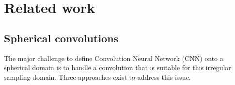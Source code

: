 \documentclass[final,twocolumn,3p,times,authoryear]{elsarticle}
\newcommand{\todo}[1]{{\color[rgb]{.6,.1,.6}{#1}}}
\newcommand{\assign}[1]{{\color[rgb]{.8,.5,.8}{Assigned: #1 }}}
\newcommand{\1}{\b{1}}              %
\newcommand{\0}{\b{0}}              %
\begin{document}







\section{Related work}
\label{sec:related}



\subsection{Spherical convolutions}
The major challenge to define Convolution Neural Network (CNN) onto a
spherical domain is to handle a convolution that is suitable for this irregular sampling domain.
Three approaches exist to address this issue.
\end{document}
